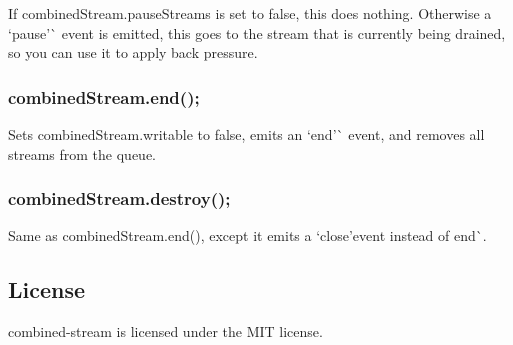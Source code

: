If {\ttfamily combined\+Stream.\+pause\+Streams} is set to {\ttfamily false}, this does nothing. Otherwise a `\textquotesingle{}pause'\`{} event is emitted, this goes to the stream that is currently being drained, so you can use it to apply back pressure.

\subsubsection*{combined\+Stream.\+end();}

Sets {\ttfamily combined\+Stream.\+writable} to false, emits an `\textquotesingle{}end'\`{} event, and removes all streams from the queue.

\subsubsection*{combined\+Stream.\+destroy();}

Same as {\ttfamily combined\+Stream.\+end()}, except it emits a `\textquotesingle{}close'{\ttfamily event instead of }\textquotesingle{}end\textquotesingle{}\`{}.

\subsection*{License}

combined-\/stream is licensed under the M\+IT license. 